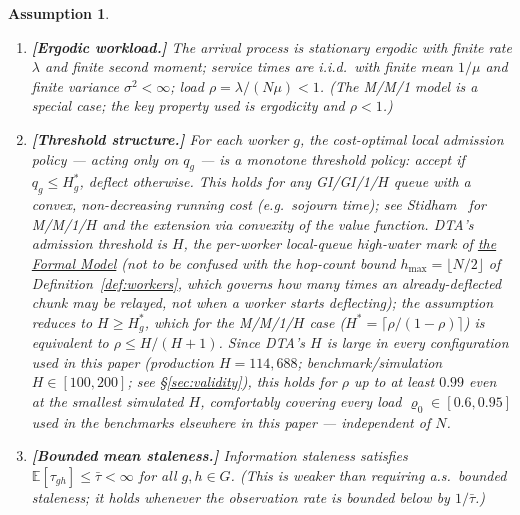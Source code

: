 \documentclass[11pt,a4paper]{report}
\newtheorem{assumption}{Assumption}[section]
\begin{document}
\begin{assumption}\label{ass:mmp}
\begin{enumerate}[label=(\textup{A\arabic*})]
  \item\label{ass:ergodic}
        \textbf{[Ergodic workload.]}
        The arrival process is stationary ergodic with finite rate
        $\lambda$ and finite second moment; service times are i.i.d.\
        with finite mean $1/\mu$ and finite variance $\sigma^2 < \infty$;
        load $\rho = \lambda/(N\mu) < 1$.  (The M/M/1 model is a special
        case; the key property used is ergodicity and $\rho < 1$.)

  \item\label{ass:threshold}
        \textbf{[Threshold structure.]}
        For each worker $g$, the cost-optimal local admission policy
        --- acting only on $q_g$ --- is a monotone threshold policy:
        accept if $q_g \leq H_g^*$, deflect otherwise.
        This holds for \emph{any} GI/GI/1/$H$ queue with a convex,
        non-decreasing running cost (e.g.\ sojourn time); see
        Stidham~\cite{stidham1985} for M/M/1/$H$ and the extension via
        convexity of the value function.
        DTA's admission threshold is $H$, the per-worker local-queue
        high-water mark of \hyperref[chap:formal_model]{the Formal Model}
        (\emph{not} to be confused with the hop-count bound $h_{\max} =
        \lfloor N/2\rfloor$ of Definition~\ref{def:workers}, which
        governs how many times an already-deflected chunk may be
        relayed, not when a worker starts deflecting); the assumption
        reduces to $H \geq
        H_g^*$, which for the M/M/1/$H$ case ($H^* =
        \lceil\rho/(1-\rho)\rceil$) is equivalent to $\rho \leq H/(H+1)$.
        Since DTA's $H$ is large in every configuration used in this
        paper (production $H = 114{,}688$; benchmark/simulation
        $H \in [100, 200]$; see \S\ref{sec:validity}), this holds for
        $\rho$ up to at least $0.99$ even at the smallest simulated $H$,
        comfortably covering every load $\varrho_0 \in [0.6, 0.95]$ used
        in the benchmarks elsewhere in this paper --- independent of
        $N$.

  \item\label{ass:bounded_tau}
        \textbf{[Bounded mean staleness.]}
        Information staleness satisfies
        $\mathbb{E}[\tau_{gh}] \leq \bar\tau < \infty$ for all $g,h \in G$.
        (This is weaker than requiring a.s.\ bounded staleness;
        it holds whenever the observation rate is bounded below by
        $1/\bar\tau$.)
\end{enumerate}
\end{assumption}
\end{document}
